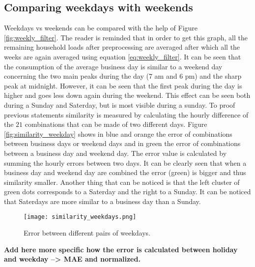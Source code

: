 \subsection{Comparing weekdays with weekends} \label{s:Comparing weekdays with weekends}
Weekdays vs weekends can be compared with the help of Figure \ref{fig:weekly_filter}. The reader is reminded that in order to get this graph, all the remaining household loads after preprocessing are averaged after which all the weeks are again averaged using equation \ref{eq:weekly_filter}. It can be seen that the consumption of the average business day is similar to a weekend day concerning the two main peaks during the day (7 am and 6 pm) and the sharp peak at midnight. However, it can be seen that the first peak during the day is higher and goes less down again during the weekend. This effect can be seen both during a Sunday and Saterday, but is most visible during a sunday. To proof previous statements similarity is measured by calculating the hourly difference of the $ 21 $ combinations that can be made of two different days. Figure \ref{fig:similarity_weekday} shows in blue and orange the error of combinations between business days or weekend days and in green the error of combinations between a business day and weekend day. The error value is calculated by summing the hourly errors between two days. It can be clearly seen that when a business day and weekend day are combined the error (green) is bigger and thus similarity smaller. Another thing that can be noticed is that the left cluster of green dots corresponds to a Saterday and the right to a Sunday. It can be noticed that Saterdays are more similar to a business day than a Sunday. 

\begin{figure}[h!]
	\centering
	\texttt{[image: similarity\_weekdays.png]}
	\caption{Error between different pairs of weekdays.}
	\label{fig:similarity_weekdays}
\end{figure}




\textbf{Add here more specific how the error is calculated between holiday and weekday --> MAE and normalized.}

